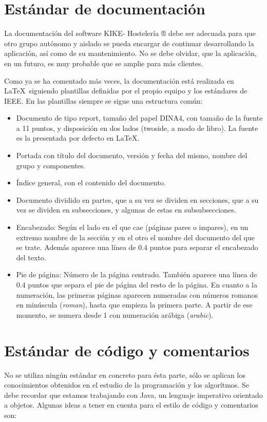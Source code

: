 \documentclass[spanish,a4paper,11pt, twoside]{report}	%
\begin{document}
	\section{Estándar de documentación}
	La documentación del software KIKE- Hostelería ® debe ser adecuada para que otro grupo autónomo y aislado se pueda encargar de continuar desarrollando la aplicación, así como de su mantenimiento. No se debe olvidar, que la aplicación, en un futuro, es muy probable que se amplie para más clientes.

	Como ya se ha comentado más veces, la documentación está realizada en \LaTeX \ siguiendo plantillas definidas por el propio equipo y los estándares de IEEE. En las plantillas siempre se sigue una estructura común:
	\begin{itemize}
		\item Documento de tipo report, tamaño del papel DINA4, con tamaño de la fuente a 11 puntos, y disposición en dos lados (twoside, a modo de libro). La fuente es la presentada por defecto en \LaTeX.
		\item Portada con título del documento, versión y fecha del mismo, nombre del grupo y componentes.
		\item Índice general, con el contenido del documento.
		\item Documento dividido en partes, que a su vez se dividen en secciones, que a su vez se dividen en subsecciones, y algunas de estas en subsubsecciones.
		\item Encabezado: Según el lado en el que cae (páginas pares o impares),  en un extremo nombre de la sección y en el otro el nombre del documento del que se trate. Además aparece una línea de 0.4 puntos para separar el encabezado del texto.
		\item Pie de página: Número de la página centrado. También aparece una línea de 0.4 puntos que separa el pie de página del resto de la página. En cuanto a la numeración, las primeras páginas aparecen numeradas con números romanos en minúscula (\textit{roman}), hasta que empieza la primera parte. A partir de ese momento, se numera desde 1 con numeración arábiga (\textit{arabic}).
	\end{itemize}

	\section{Estándar de código y comentarios}
	
	No se utiliza ningún estándar en concreto para ésta parte, sólo se aplican los conocimientos obtenidos en el estudio de la programación y los algorítmos. Se debe recordar que estamos trabajando con Java, un lenguaje imperativo orientado a objetos. Algunas ideas a tener en cuenta para el estilo de código y comentarios son:
\end{document}
